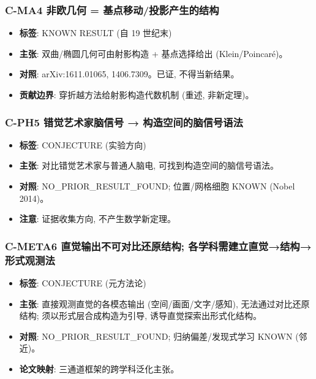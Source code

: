 \documentclass[
]{article}
\providecommand{\tightlist}{%
  \setlength{\itemsep}{0pt}\setlength{\parskip}{0pt}}
\begin{document}
\subsubsection{C-MA4 非欧几何 =
基点移动/投影产生的结构}\label{c-ma4-ux975eux6b27ux51e0ux4f55-ux57faux70b9ux79fbux52a8ux6295ux5f71ux4ea7ux751fux7684ux7ed3ux6784}

\begin{itemize}
\tightlist
\item
  \textbf{标签}: KNOWN RESULT (自 19 世纪末)
\item
  \textbf{主张}: 双曲/椭圆几何可由射影构造 + 基点选择给出
  (Klein/Poincaré)。
\item
  \textbf{对照}: arXiv:1611.01065, 1406.7309。已证, 不得当新结果。
\item
  \textbf{贡献边界}: 穿折越方法给射影构造代数机制 (重述, 非新定理)。
\end{itemize}

\subsubsection{C-PH5 错觉艺术家脑信号 →
构造空间的脑信号语法}\label{c-ph5-ux9519ux89c9ux827aux672fux5bb6ux8111ux4fe1ux53f7-ux6784ux9020ux7a7aux95f4ux7684ux8111ux4fe1ux53f7ux8bedux6cd5}

\begin{itemize}
\tightlist
\item
  \textbf{标签}: CONJECTURE (实验方向)
\item
  \textbf{主张}: 对比错觉艺术家与普通人脑电,
  可找到构造空间的脑信号语法。
\item
  \textbf{对照}: NO\_PRIOR\_RESULT\_FOUND; 位置/网格细胞 KNOWN (Nobel
  2014)。
\item
  \textbf{注意}: 证据收集方向, 不产生数学新定理。
\end{itemize}

\subsubsection{C-META6 直觉输出不可对比还原结构;
各学科需建立直觉→结构→形式观测法}\label{c-meta6-ux76f4ux89c9ux8f93ux51faux4e0dux53efux5bf9ux6bd4ux8fd8ux539fux7ed3ux6784-ux5404ux5b66ux79d1ux9700ux5efaux7acbux76f4ux89c9ux7ed3ux6784ux5f62ux5f0fux89c2ux6d4bux6cd5}

\begin{itemize}
\tightlist
\item
  \textbf{标签}: CONJECTURE (元方法论)
\item
  \textbf{主张}: 直接观测直觉的各模态输出 (空间/画面/文字/感知),
  无法通过对比还原 结构; 须以形式层合成构造为引导,
  诱导直觉探索出形式化结构。
\item
  \textbf{对照}: NO\_PRIOR\_RESULT\_FOUND; 归纳偏差/发现式学习 KNOWN
  (邻近)。
\item
  \textbf{论文映射}: 三通道框架的跨学科泛化主张。
\end{itemize}
\end{document}
